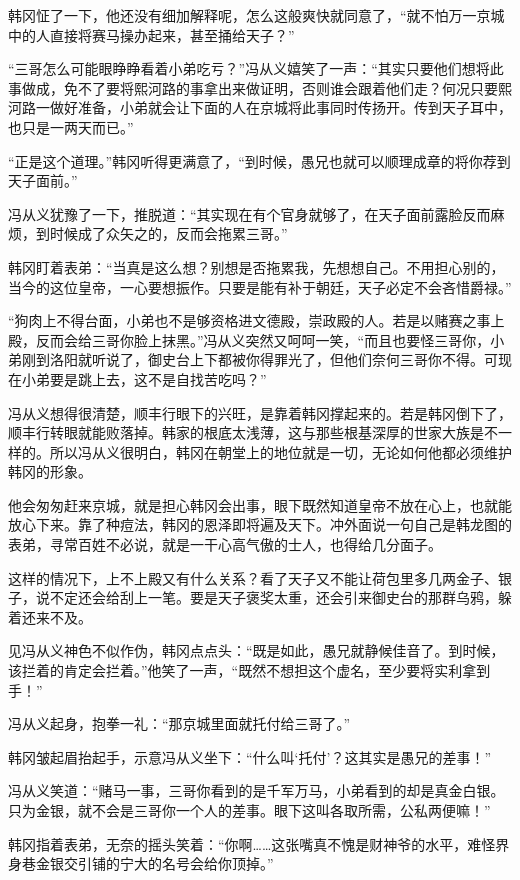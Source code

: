 韩冈怔了一下，他还没有细加解释呢，怎么这般爽快就同意了，“就不怕万一京城中的人直接将赛马操办起来，甚至捅给天子？”

“三哥怎么可能眼睁睁看着小弟吃亏？”冯从义嬉笑了一声：“其实只要他们想将此事做成，免不了要将熙河路的事拿出来做证明，否则谁会跟着他们走？何况只要熙河路一做好准备，小弟就会让下面的人在京城将此事同时传扬开。传到天子耳中，也只是一两天而已。”

“正是这个道理。”韩冈听得更满意了，“到时候，愚兄也就可以顺理成章的将你荐到天子面前。”

冯从义犹豫了一下，推脱道：“其实现在有个官身就够了，在天子面前露脸反而麻烦，到时候成了众矢之的，反而会拖累三哥。”

韩冈盯着表弟：“当真是这么想？别想是否拖累我，先想想自己。不用担心别的，当今的这位皇帝，一心要想振作。只要是能有补于朝廷，天子必定不会吝惜爵禄。”

“狗肉上不得台面，小弟也不是够资格进文德殿，崇政殿的人。若是以赌赛之事上殿，反而会给三哥你脸上抹黑。”冯从义突然又呵呵一笑，“而且也要怪三哥你，小弟刚到洛阳就听说了，御史台上下都被你得罪光了，但他们奈何三哥你不得。可现在小弟要是跳上去，这不是自找苦吃吗？”

冯从义想得很清楚，顺丰行眼下的兴旺，是靠着韩冈撑起来的。若是韩冈倒下了，顺丰行转眼就能败落掉。韩家的根底太浅薄，这与那些根基深厚的世家大族是不一样的。所以冯从义很明白，韩冈在朝堂上的地位就是一切，无论如何他都必须维护韩冈的形象。

他会匆匆赶来京城，就是担心韩冈会出事，眼下既然知道皇帝不放在心上，也就能放心下来。靠了种痘法，韩冈的恩泽即将遍及天下。冲外面说一句自己是韩龙图的表弟，寻常百姓不必说，就是一干心高气傲的士人，也得给几分面子。

这样的情况下，上不上殿又有什么关系？看了天子又不能让荷包里多几两金子、银子，说不定还会给刮上一笔。要是天子褒奖太重，还会引来御史台的那群乌鸦，躲着还来不及。

见冯从义神色不似作伪，韩冈点点头：“既是如此，愚兄就静候佳音了。到时候，该拦着的肯定会拦着。”他笑了一声，“既然不想担这个虚名，至少要将实利拿到手！”

冯从义起身，抱拳一礼：“那京城里面就托付给三哥了。”

韩冈皱起眉抬起手，示意冯从义坐下：“什么叫‘托付’？这其实是愚兄的差事！”

冯从义笑道：“赌马一事，三哥你看到的是千军万马，小弟看到的却是真金白银。只为金银，就不会是三哥你一个人的差事。眼下这叫各取所需，公私两便嘛！”

韩冈指着表弟，无奈的摇头笑着：“你啊……这张嘴真不愧是财神爷的水平，难怪界身巷金银交引铺的宁大的名号会给你顶掉。”

